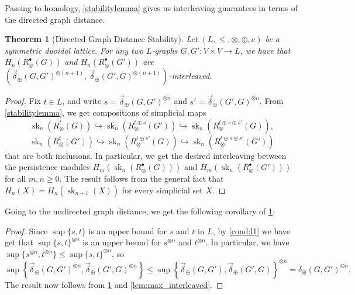 \documentclass[a4paper,11pt]{article}
\newcommand{\tensor}{\otimes}
\newcommand{\atensor}{\oplus}
\newcounter{dummy}\numberwithin{dummy}{section}
\newtheorem{theorem}[dummy]{Theorem}
\theoremstyle{remark}
\begin{document}
Passing to homology, \cref{stabilitylemma} gives us interleaving guarantees in terms of the directed graph distance.

\begin{theorem}[Directed Graph Distance Stability]\label{stability1}
\sloppy Let $(L,\leq,\tensor,\atensor,e)$ be a symmetric duoidal lattice. For any two $L$-graphs $G,G'\colon V\times V\to L$, we have that $H_n(R_\tensor^\bullet(G))$ and $H_n(R_\tensor^\bullet(G'))$ are $(\vec{\delta}_\atensor(G,G')^{\tensor (n+1)},\,\vec{\delta}_\atensor(G',G)^{\tensor (n+1)})$-interleaved.
\end{theorem}
\begin{proof}
    Fix $t\in L$, and write $s=\vec{\delta}_\atensor(G,G')^{\tensor n}$ and $s'=\vec{\delta}_\atensor(G',G)^{\tensor n}$. From \cref{stabilitylemma}, we get compositions of simplicial maps
    \begin{equation*}
        \operatorname{sk}_n(R_\tensor^t(G))\hookrightarrow \operatorname{sk}_n(R_\tensor^{t\atensor s}(G'))\hookrightarrow \operatorname{sk}_n(R_\tensor^{t\atensor s\atensor s'}(G)),
    \end{equation*}
    \begin{equation*}
        \operatorname{sk}_n(R_\tensor^t(G'))\hookrightarrow \operatorname{sk}_n(R_\tensor^{t\atensor s'}(G))\hookrightarrow \operatorname{sk}_n(R_\tensor^{t\atensor s\atensor s'}(G'))
    \end{equation*}
    that are both inclusions. In particular, we get the desired interleaving between the persistence modules $H_m(\operatorname{sk}_n(R_\tensor^\bullet(G)))$ and $H_m(\operatorname{sk}_n(R_\tensor^\bullet(G')))$ for all $m,n\geq 0$. The result follows from the general fact that $H_n(X)=H_n(\operatorname{sk}_{n+1}(X))$ for every simplicial set $X$.
\end{proof}

Going to the undirected graph distance, we get the following corollary of \cref{stability1}:

\graphdistancestability
\begin{proof}
Since $\sup\{s,t\}$ is an upper bound for $s$ and $t$ in $L$, by \ref{cond:l1} we have get that $\sup\{s,t\}^{\tensor n}$ is an upper bound for $s^{\tensor n}$ and $t^{\tensor n}$. In particular, we have $\sup\{s^{\tensor n}, t^{\tensor n}\}\leq\sup\{s,t\}^{\tensor n}$, so
\begin{equation*}
    \sup\left\{\vec{\delta}_\atensor(G,G')^{\tensor n}, \vec{\delta}_\atensor(G',G)^{\tensor n}\right\}\leq\sup\left\{\vec{\delta}_\atensor(G,G'), \vec{\delta}_\atensor(G',G)\right\}^{\tensor n}=\delta_\atensor(G,G')^{\tensor n}.
\end{equation*}
The result now follows from \cref{stability1} and \cref{lem:max_interleaved}.
\end{proof}
\end{document}
